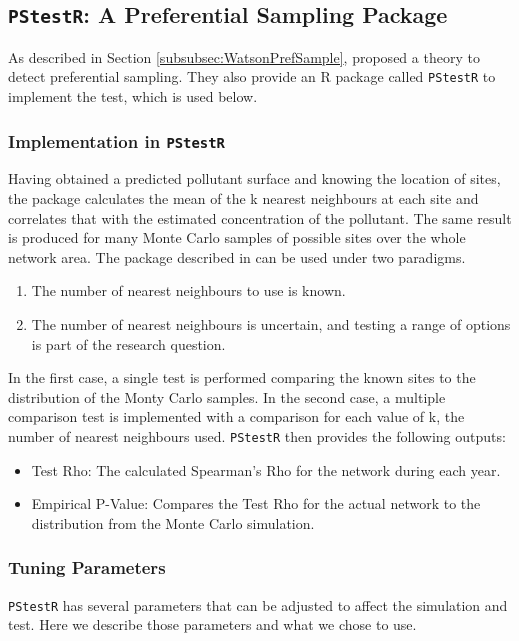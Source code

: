 \documentclass{article}
\begin{document}
\subsection{\texttt{PStestR}: A Preferential Sampling Package}
\label{subsec:prefsamppkg}

As described in Section \ref{subsubsec:WatsonPrefSample}, \citet{watson2020} proposed a theory to detect preferential sampling.  They also provide an R package called \texttt{PStestR} to implement the test, which is used below.

\subsubsection*{Implementation in \texttt{PStestR}}
\label{subsubsec:implementation}
Having obtained a predicted pollutant surface and knowing the location of sites, the package calculates the mean of the \gls{k} nearest neighbours at each site and correlates that with the estimated concentration of the pollutant. The same result is produced for many Monte Carlo samples of possible sites over the whole network area.
The package described in \cite{watson2020} can be used under two paradigms. 
\begin{enumerate}
	\item The number of nearest neighbours to use is known.
	\item The number of nearest neighbours is uncertain, and testing a range of options is part of the research question.
\end{enumerate}
In the first case, a single test is performed comparing the known sites to the distribution of the Monty Carlo samples.  In the second case, a multiple comparison test is implemented with a comparison for each value of \gls{k}, the number of nearest neighbours used.  \texttt{PStestR} then provides the following outputs:
\begin{itemize}
	\item Test Rho:  The calculated Spearman's Rho for the network during each year.
	\item Empirical P-Value:  Compares the Test Rho for the actual network to the distribution from the Monte Carlo simulation.
\end{itemize}

\subsubsection*{Tuning Parameters}
\label{subsubsec:tuneparameters}
\texttt{PStestR} has several parameters that can be adjusted to affect the simulation and test.  Here we describe those parameters and what we chose to use.
\end{document}
